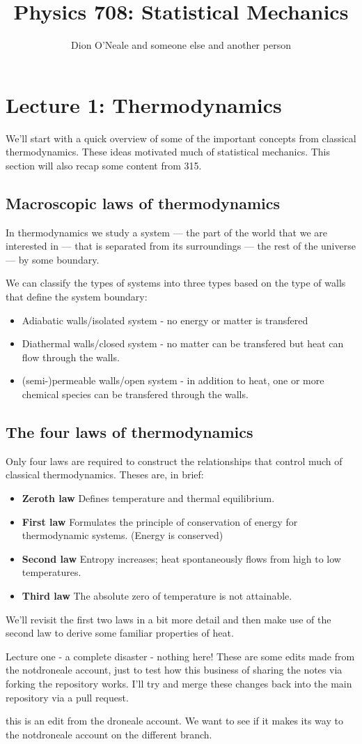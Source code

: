 \documentclass{article}
\title{Physics 708: Statistical Mechanics}
\author{Dion O'Neale 
	and someone else 
	and another person}
\begin{document}
\maketitle
\section{Lecture 1: Thermodynamics}
We'll start with a quick overview of some of the important concepts from classical thermodynamics. These ideas motivated much of statistical mechanics. This section will also recap some content from 315.

\subsection*{Macroscopic laws of thermodynamics}
In thermodynamics we study a system --- the part of the world that we are interested in --- that is separated from its surroundings --- the rest of the universe --- by some boundary.

We can classify the types of systems into three types based on the type of walls that define the system boundary:
\begin{itemize}
\item Adiabatic walls/isolated system - no energy or matter is transfered
\item Diathermal walls/closed system - no matter can be transfered but heat can flow through the walls.
\item (semi-)permeable walls/open system - in addition to heat, one or more chemical species can be transfered through the walls. 
\end{itemize}

\subsection*{The four laws of thermodynamics}
Only four laws are required to construct the relationships that control much of classical thermodynamics. Theses are, in brief:
\begin{itemize}
\item {\bf Zeroth law} Defines temperature and thermal equilibrium.
\item {\bf First law} Formulates the principle of conservation of energy for thermodynamic systems. (Energy is conserved)
\item {\bf Second law} Entropy increases; heat spontaneously flows from high to low temperatures.
\item {\bf Third law} The absolute zero of temperature is not attainable.  
\end{itemize}


We'll revisit the first two laws in a bit more detail and then make use of the second law to derive some familiar properties of heat.


Lecture one - a complete disaster - nothing here!
These are some edits made from the notdroneale account, just to test how this business of sharing the notes via forking the repository works. I'll try and merge these changes back into the main repository via a pull request.


this is an edit from the droneale account. We want to see if it makes its way to the notdroneale account on the different branch. 
\end{document}
